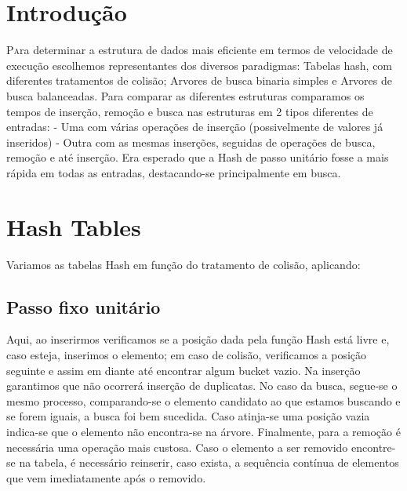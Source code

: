 \documentclass[twoside]{article}
\begin{document}
\begin{multicols}{2} %

\section{Introdução}

\lettrine[nindent=0em,lines=3]{P}ara determinar a estrutura de dados mais eficiente em termos de velocidade de execução escolhemos representantes dos diversos paradigmas:
Tabelas hash, com diferentes tratamentos de colisão; Arvores de busca binaria simples e Arvores de busca balanceadas.
Para comparar as diferentes estruturas comparamos os tempos de inserção, remoção e busca nas estruturas em 2 tipos diferentes de entradas:
- Uma com várias operações de inserção (possivelmente de valores já inseridos)
- Outra com as mesmas inserções, seguidas de operações de busca, remoção e até inserção. 
Era esperado que a Hash de passo unitário fosse a mais rápida em todas as entradas, destacando-se principalmente em busca. 



\section{Hash Tables}


Variamos as tabelas Hash em função do tratamento de colisão, aplicando:

\subsection{ Passo fixo unitário }
    Aqui, ao inserirmos verificamos se a posição dada pela função Hash está livre e, caso esteja, inserimos o elemento; em caso de colisão, verificamos a posição seguinte e assim em diante até encontrar algum bucket vazio. Na inserção garantimos que não ocorrerá inserção de duplicatas.
    No caso da busca, segue-se o mesmo processo, comparando-se o elemento candidato ao que estamos buscando e se forem iguais, a busca foi bem sucedida. Caso atinja-se uma posição vazia indica-se que o elemento não encontra-se na árvore.
    Finalmente, para a remoção é necessária uma operação mais custosa. Caso o elemento a ser removido encontre-se na tabela, é necessário reinserir, caso exista, a sequência contínua de elementos que vem imediatamente após o removido.


\end{multicols}
\end{document}
